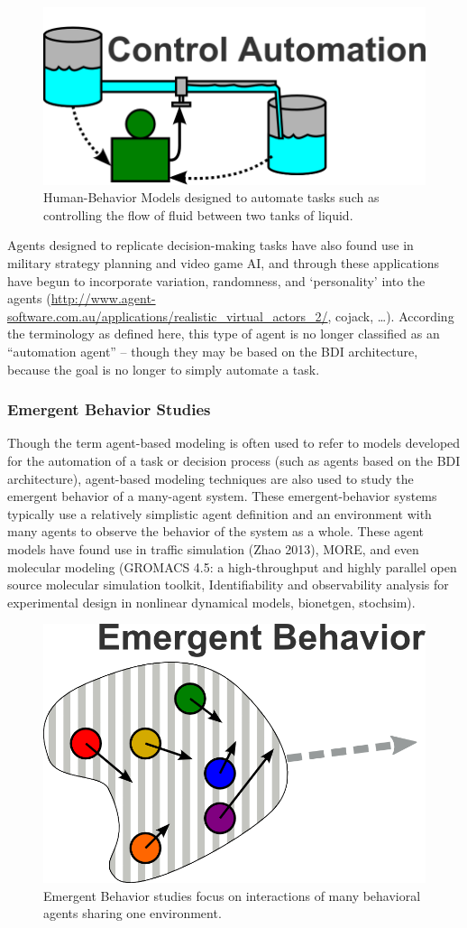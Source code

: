\begin{figure}[!t]
  \centering
  \includegraphics[width=0.5\columnwidth]{img/automationAgent}
  \caption{Human-Behavior Models designed to automate tasks such as controlling the flow of fluid between two tanks of liquid.}
  \label{automationAgent}
\end{figure}

Agents designed to replicate decision-making tasks have also found use in military strategy planning and video game AI, and through these applications have begun to incorporate variation, randomness, and ‘personality’ into the agents (\url{http://www.agent-software.com.au/applications/realistic_virtual_actors_2/}, cojack, …). 
According the terminology as defined here, this type of agent is no longer classified as an “automation agent” -- though they may be based on the BDI architecture, because the goal is no longer to simply automate a task.

\subsubsection{Emergent Behavior Studies}
Though the term agent-based modeling is often used to refer to models developed for the automation of a task or decision process (such as agents based on the BDI architecture), agent-based modeling techniques are also used to study the emergent behavior of a many-agent system. 
These emergent-behavior systems typically use a relatively simplistic agent definition and an environment with many agents to observe the behavior of the system as a whole. 
These agent models have found use in traffic simulation (Zhao 2013), MORE, and even molecular modeling (GROMACS 4.5: a high-throughput and highly parallel open source molecular simulation toolkit, Identifiability and observability analysis for experimental design in nonlinear dynamical models, bionetgen, stochsim).

\begin{figure}[!t]
  \centering
  \includegraphics[width=0.5\columnwidth]{img/emergentBehavior}
  \caption{Emergent Behavior studies focus on interactions of many behavioral agents sharing one environment.}
  \label{emergentBehavior}
\end{figure}

